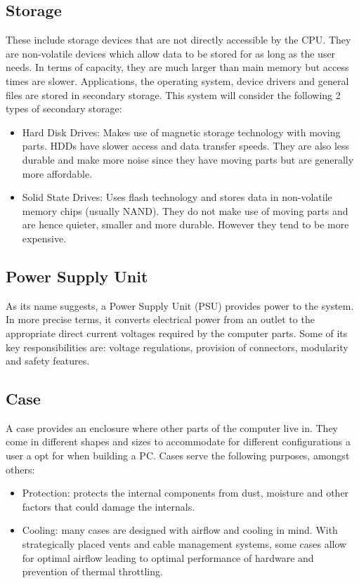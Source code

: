 \documentclass[12pt, a4paper]{article}
\begin{document}
\subsection{Storage}
These include storage devices that are not directly accessible by the CPU.
They are non-volatile devices which allow data to be stored for as long
as the user needs. In terms of capacity, they are much larger than main
memory but access times are slower. Applications, the operating system,
device drivers and general files are stored in secondary storage. This
system will consider the following 2 types of secondary storage:
\begin{itemize}
  \item Hard Disk Drives: Makes use of magnetic storage technology with 
    moving parts. HDDs have slower access and data transfer speeds. They
    are also less durable and make more noise since they have 
    moving parts but are generally more affordable. 
  \item Solid State Drives: Uses flash technology and stores data in 
    non-volatile memory chips (usually NAND). They do not make use
    of moving parts and are hence quieter, smaller and more durable. 
    However they tend to be more expensive.
\end{itemize}

\subsection{Power Supply Unit}
As its name suggests, a Power Supply Unit (PSU) provides power to the 
system. In more precise terms, it converts electrical power from an outlet
to the appropriate direct current voltages required by the computer parts.
Some of its key responsibilities are: voltage regulations, provision
of connectors, modularity and safety features.

\subsection{Case}
A case provides an enclosure where other parts of the computer live in.
They come in different shapes and sizes to accommodate for different
configurations a user a opt for when building a PC. Cases serve the 
following purposes, amongst others:
\begin{itemize}
  \item Protection: protects the internal components from dust, moisture
    and other factors that could damage the internals.
  \item Cooling: many cases are designed with airflow and cooling in mind.
    With strategically placed vents and cable management systems, some cases
    allow for optimal airflow leading to optimal performance of hardware and
    prevention of thermal throttling.
\end{itemize}
\end{document}
